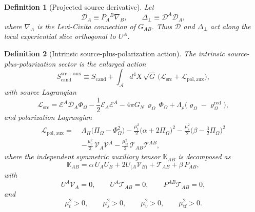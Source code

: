 \documentclass[11pt]{article}
\newcommand{\Sub}{\mathcal{A}}
\newcommand{\ProjSub}{P}
\newcommand{\SpatialD}{\mathcal D}
\newcommand{\LapPerp}{\Delta_\perp}
\newcommand{\FlowPot}{\Phi_\Omega}
\newcommand{\BalanceField}{\Pi_\Omega}
\newcommand{\BalMult}{\Lambda_\Pi}
\newcommand{\SourceDensity}{\varrho_\Omega}
\newcommand{\SourceDensityRed}{\varrho_\Omega^{\mathrm{red}}}
\newcommand{\SourceMult}{\Lambda_\rho}
\newcommand{\SourceFlux}{\mathcal E}
\newcommand{\AuxPol}{\mathbb K}
\newcommand{\CandAction}{S_{\mathrm{cand}}}
\newcommand{\IntrinsicAction}{S_{\mathrm{cand}}^{\mathrm{src+aux}}}
\newtheorem{definition}{Definition}
\begin{document}
\begin{definition}[Projected source derivative]
\label{def:projected}
Let
\begin{equation}
\SpatialD_A\equiv \ProjSub_A{}^B\nabla_B,
\qquad
\LapPerp\equiv \SpatialD^A\SpatialD_A,
\label{eq:projderiv}
\end{equation}
where \(\nabla_A\) is the Levi-Civita connection of \(G_{AB}\). Thus \(\SpatialD\) and \(\LapPerp\) act along the local experiential slice orthogonal to \(U^A\).
\end{definition}

\begin{definition}[Intrinsic source-plus-polarization action]
\label{def:action}
The \emph{intrinsic source-plus-polarization sector} is the enlarged action
\begin{equation}
\IntrinsicAction
\equiv
\CandAction
+
\int_{\Sub} d^4X\,\sqrt{G}\,
\bigl(
\mathcal L_{\mathrm{src}}
+\mathcal L_{\mathrm{pol,aux}}
\bigr),
\label{eq:fullaction}
\end{equation}
with source Lagrangian
\begin{equation}
\mathcal L_{\mathrm{src}}
=
\SourceFlux^A\SpatialD_A\FlowPot
-\frac12 \SourceFlux_A\SourceFlux^A
-4\pi G_N\,\SourceDensity\,\FlowPot
+\SourceMult\bigl(\SourceDensity-\SourceDensityRed\bigr),
\label{eq:lsrc}
\end{equation}
and polarization Lagrangian
\begin{align}
\mathcal L_{\mathrm{pol,aux}}
=\;&
\BalMult\bigl(\BalanceField-\FlowPot^2\bigr)
-\frac{\mu_t^2}{2}\bigl(\alpha+2\BalanceField\bigr)^2
-\frac{\mu_s^2}{2}\bigl(\beta-\tfrac32\BalanceField\bigr)^2
\nonumber\\
&-\frac{\mu_v^2}{2}\,\mathcal V_A\mathcal V^A
-\frac{\mu_{\mathrm{tf}}^2}{2}\,\mathcal T_{AB}\mathcal T^{AB},
\label{eq:laux}
\end{align}
where the independent symmetric auxiliary tensor \(\AuxPol_{AB}\) is decomposed as
\begin{equation}
\AuxPol_{AB}
=
\alpha\,U_AU_B
+2U_{(A}\mathcal V_{B)}
+\mathcal T_{AB}
+\beta\,\ProjSub_{AB},
\label{eq:Kdecomp}
\end{equation}
with
\begin{equation}
U^A\mathcal V_A=0,
\qquad
U^A\mathcal T_{AB}=0,
\qquad
\ProjSub^{AB}\mathcal T_{AB}=0,
\label{eq:TVcond}
\end{equation}
and
\begin{equation}
\mu_t^2>0,
\qquad
\mu_s^2>0,
\qquad
\mu_v^2>0,
\qquad
\mu_{\mathrm{tf}}^2>0.
\label{eq:masses}
\end{equation}
\end{definition}
\end{document}
